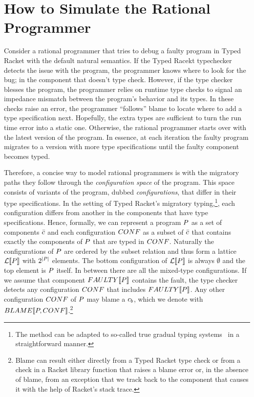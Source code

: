 \section{How to Simulate the Rational Programmer} \label{sec:rational}

Consider a rational programmer  that tries to debug a faulty program in
Typed Racket with the default natural semantics. If the Typed Racekt
typechecker detects the issue with the program, the programmer knows where
to look for the bug; in the component that doesn't type check. However, if
the type checker blesses the program, the programmer relies on  runtime
type checks  to  signal an impedance mismatch between the
program's behavior and its types. In these checks raise an error, the programmer ``follows'' blame to
locate where to add a type specification next.  Hopefully, the extra
types are sufficient to turn the run time error into a static one. Otherwise,
the rational programmer starts over with the latest version of the program. 
In essence, at each iteration the
faulty program migrates to a version with more type specifications until
the faulty component becomes typed.

Therefore, a concise way to model rational programmers is with the
migratory paths they follow through the \emph{configuration space} of the
program. This space consists of variants of the program, dubbed
\emph{configurations}, that differ in their type specifications. In the 
setting of Typed Racket's migratory typing,\footnote{The
method can be adapted to so-called true gradual typing
systems~\cite{svcb-snapl-2015} in a straightforward manner.}, each
configuration differs from another in the components that have type
specifications. Hence, formally, we can represent a program
$P$ as a set of components $\bar{c}$ and each
configuration $CONF$  as a subset of $\bar{c}$ that contains
exactly the components of  $P$ that are typed in $CONF$. Naturally
the configurations of  $P$ are ordered by the subset relation and
thus form a lattice $\mathcal{L}\llbracket P\rrbracket$ with $2^{\mid P \mid}$ elements.
The bottom configuration of $\mathcal{L}\llbracket P\rrbracket$ is always $\emptyset$ and
the top element is $P$ itself. In between there are all the
mixed-type configurations. If we assume that  component
$FAULTY\llbracket P\rrbracket$ contains the fault, the type checker detects any
configuration $CONF$ that includes $FAULTY\llbracket P\rrbracket$. Any other
configuration $CONF$ of $P$ may blame a $c_b$, which we denote with
$BLAME\llbracket P,CONF\rrbracket$.\footnote{Blame can result either directly from a Typed
Racket type check or from a check in a Racket library function that raises
a blame error or, in the absence of blame, from an
exception that we track back to the component that causes it with the help
of Racket's stack trace.}


